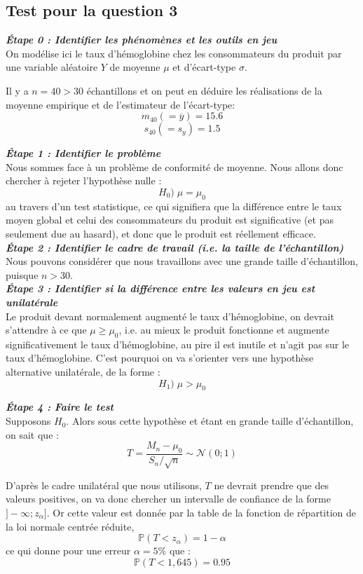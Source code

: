 \documentclass[a4paper,oneside,12pt]{article}
\theoremstyle{plain}
\def\P{{\mathbb P}}
\begin{document}
\subsection*{Test pour la question 3}

\textit{\textbf{Étape 0 : Identifier les phénomènes et les outils en jeu}}\\
On modélise ici le taux d'hémoglobine chez les consommateurs du produit par une variable aléatoire $Y$ de moyenne $\mu$ et d'écart-type $\sigma$.
    
Il y a $n = 40>30$ échantillons et on peut en déduire les réalisations de la moyenne empirique et de l'estimateur de l'écart-type:
$$m_{40} (=\overline{y}) = 15.6$$
$$s_{40} (=s_{y}) = 1.5$$
    
\textit{\textbf{Étape 1 : Identifier le problème}}\\
Nous sommes face à un problème de conformité de moyenne. Nous allons donc chercher à rejeter l'hypothèse nulle :
$$H_0) \;\mu=\mu_0$$ 
au travers d'un test statistique, ce qui signifiera que la différence entre le taux moyen global et celui des consommateurs du produit est significative (et pas seulement due au hasard), et donc que le produit est réellement efficace.\\

\textit{\textbf{Étape 2 : Identifier le cadre de travail (i.e. la taille de l'échantillon)}}\\
Nous pouvons considérer que nous travaillons avec une grande taille d'échantillon, puisque $n>30$.\\
    
\textit{\textbf{Étape 3 : Identifier si la différence entre les valeurs en jeu est unilatérale}}\\
Le produit devant normalement augmenté le taux d'hémoglobine, on devrait s'attendre à ce que $\mu \ge \mu_0$, i.e. au mieux le produit fonctionne et augmente significativement le taux d'hémoglobine, au pire il est inutile et n'agit pas sur le taux d'hémoglobine. C'est pourquoi on va s'orienter vers une hypothèse alternative unilatérale, de la forme : $$H_1) \;\mu > \mu_0$$
    
\textit{\textbf{Étape 4 : Faire le test}}\\
Supposons $H_0$. Alors sous cette hypothèse et étant en grande taille d'échantillon, on sait que :
$$ T = \frac{M_n-\mu_0}{S_n/\sqrt{n}} \sim \mathcal{N}(0;1)$$
    
D'après le cadre unilatéral que nous utilisons, $T$ ne devrait prendre que des valeurs positives, on va donc chercher un intervalle de confiance de la forme $]-\infty;z_\alpha]$. Or cette valeur est donnée par la table de la fonction de répartition de la loi normale centrée réduite, 
$$\P(T<z_\alpha) = 1-\alpha$$
ce qui donne pour une erreur $\alpha = 5\%$ que :
$$\P(T < 1,645) = 0.95$$
    
\end{document}
